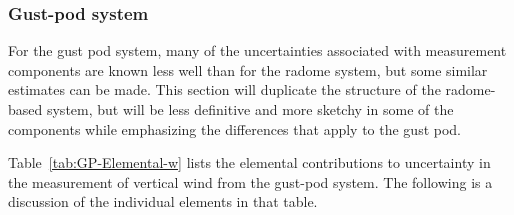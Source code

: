 \documentclass[12pt,twoside,english]{article}\usepackage[]{graphicx}\usepackage[]{color}
\let\OrgIndex\index
\renewcommand*{\index}[1]{\OrgIndex{#1}}
\begin{document}

\subsubsection{Gust-pod system}

For the gust pod system, many of the uncertainties associated with measurement components are known less well than for the radome system, but some similar estimates can be made. This section will duplicate the structure of the radome-based system, but will be less definitive and more sketchy in some of the components while emphasizing the differences that apply to the gust pod. 

Table~\ref{tab:GP-Elemental-w} lists the elemental contributions to uncertainty in the measurement of vertical wind from the gust-pod system. The following is a discussion of the individual elements in that table. 
\end{document}
